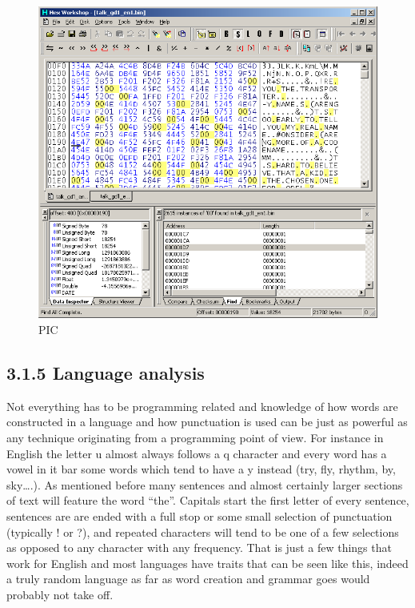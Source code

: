 \documentclass[
]{book}
\begin{document}
\begin{figure}
\centering
\includegraphics{images/96_home_fast6191_romhackingguide_unrenamed_file___ders_romhackingguidertextfrequencyanalysis2.png}
\caption{PIC}
\end{figure}

\hypertarget{language-analysis}{%
\subsection{3.1.5 Language analysis}\label{language-analysis}}

Not everything has to be programming related and knowledge of how words are constructed in a language and how punctuation is used can be just as powerful as any technique originating from a programming point of view. For instance in English the letter u almost always follows a q character and every word has a vowel in it bar some words which tend to have a y instead (try, fly, rhythm, by, sky\ldots.). As mentioned before many sentences and almost certainly larger sections of text will feature the word ``the''. Capitals start the first letter of every sentence, sentences are are ended with a full stop or some small selection of punctuation (typically ! or ?), and repeated characters will tend to be one of a few selections as opposed to any character with any frequency. That is just a few things that work for English and most languages have traits that can be seen like this, indeed a truly random language as far as word creation and grammar goes would probably not take off.
\end{document}
